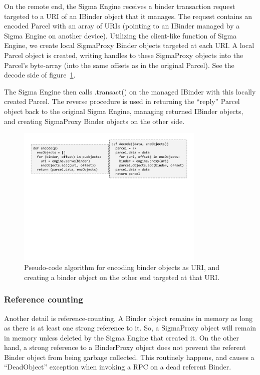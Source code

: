 \documentclass[prodmode]{acmlarge}
\begin{document}
On the remote end, the Sigma Engine receives a binder transaction request targeted to a URI of an IBinder object that it manages. The request contains an encoded Parcel with an array of URIs (pointing to an IBinder managed by a Sigma Engine on another device). Utilizing the client-like function of Sigma Engine, we create local SigmaProxy Binder objects targeted at each URI. A local Parcel object is created, writing handles to these SigmaProxy objects into the Parcel's byte-array (into the same offsets as in the original Parcel). See the decode side of figure~\ref{fig:encodeParcel}.

The Sigma Engine then calls .transact() on the managed IBinder with this locally created Parcel.  The reverse procedure is used in returning the ``reply'' Parcel object back to the original Sigma Engine, managing returned IBinder objects, and creating SigmaProxy Binder objects on the other side.

\begin{figure}[h]
\centering
\includegraphics[width=0.8\textwidth]{drawings/encodeObjects.pdf}
\caption{Pseudo-code algorithm for encoding binder objects as URI, and creating a binder object on the other end targeted at that URI.}
\label{fig:encodeParcel}
\end{figure}

\subsubsection{Reference counting}
\label{sec:ReferenceCounting}
Another detail is reference-counting. A Binder object remains in memory as long as there is at least one strong reference to it. So, a SigmaProxy object will remain in memory unless deleted by the Sigma Engine that created it. On the other hand, a strong reference to a BinderProxy object does not prevent the referent Binder object from being garbage collected. This routinely happens, and causes a ``DeadObject'' exception when invoking a RPC on a dead referent Binder.
\end{document}

